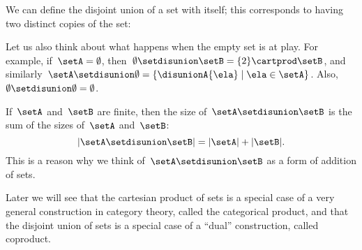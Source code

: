We can define the disjoint union of a set with itself; this corresponds to having two distinct copies of the set:

Let us also think about what happens when the empty set is at play.
For example, if~$\setA = \emptyset$, then~$\emptyset \setdisunion \setB =  \{2\} \cartprod \setB$, and similarly~$\setA \setdisunion \emptyset =  \{ \disunionA{\ela} \mid \ela \in \setA \}$.
Also,~$\emptyset \setdisunion \emptyset = \emptyset$.

\begin{remark}
    If~$\setA$ and~$\setB$ are finite, then the size of~$\setA \setdisunion \setB$ is the sum of the sizes of~$\setA$ and~$\setB$:
    \begin{equation*}
        \vert \setA \setdisunion \setB \vert = \vert \setA \vert + \vert \setB \vert.
    \end{equation*}
    This is a reason why we think of~$\setA \setdisunion \setB$ as a form of addition of sets.
\end{remark}

\begin{remark}
    Later we will see that the cartesian product of sets is a special case of a very general construction in category theory, called the categorical product, and that the disjoint union of sets is a special case of a ``dual'' construction, called coproduct.
\end{remark}
